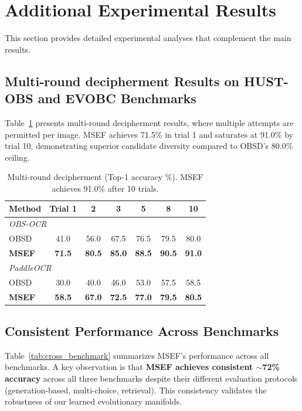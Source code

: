 \documentclass{article}
\begin{document}
\section{Additional Experimental Results}
\label{app:results}

This section provides detailed experimental analyses that complement the main results.

\subsection{Multi-round decipherment Results on HUST-OBS and EVOBC Benchmarks}
\label{app:multi-round}
Table~\ref{tab:multi_round} presents multi-round decipherment results, where multiple attempts are permitted per image. MSEF achieves 71.5\% in trial 1 and saturates at 91.0\% by trial 10, demonstrating superior candidate diversity compared to OBSD's 80.0\% ceiling.

\begin{table}[t]
\centering
\small
\caption{Multi-round decipherment (Top-1 accuracy \%). MSEF achieves 91.0\% after 10 trials.}
\label{tab:multi_round}
\begin{tabular}{lcccccc}
\toprule
\textbf{Method} & \textbf{Trial 1} & \textbf{2} & \textbf{3} & \textbf{5} & \textbf{8} & \textbf{10} \\
\midrule
\multicolumn{7}{l}{\textit{OBS-OCR}} \\
OBSD & 41.0 & 56.0 & 67.5 & 76.5 & 79.5 & 80.0 \\
\rowcolor{gray!10}
\textbf{MSEF} & \textbf{71.5} & \textbf{80.5} & \textbf{85.0} & \textbf{88.5} & \textbf{90.5} & \textbf{91.0} \\
\midrule
\multicolumn{7}{l}{\textit{PaddleOCR}} \\
OBSD & 30.0 & 40.0 & 46.0 & 53.0 & 57.5 & 58.5 \\
\rowcolor{gray!10}
\textbf{MSEF} & \textbf{58.5} & \textbf{67.0} & \textbf{72.5} & \textbf{77.0} & \textbf{79.5} & \textbf{80.5} \\
\bottomrule
\end{tabular}
\end{table}

\subsection{Consistent Performance Across Benchmarks}

Table~\ref{tab:cross_benchmark} summarizes MSEF's performance across all benchmarks. A key observation is that \textbf{MSEF achieves consistent $\sim$72\% accuracy} across all three benchmarks despite their different evaluation protocols (generation-based, multi-choice, retrieval). This consistency validates the robustness of our learned evolutionary manifolds.
\end{document}

